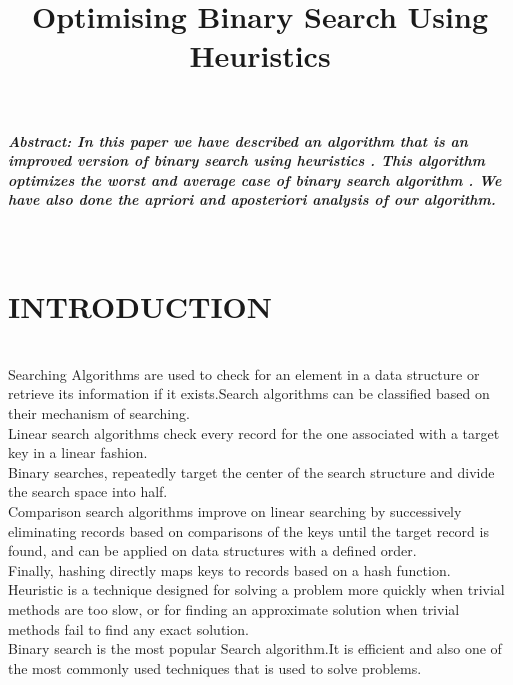 \documentclass[conference]{IEEEtran}
\begin{document}
\title{ Optimising Binary Search Using Heuristics\\
}
\author{
\and
{}
\and
{}
}

\maketitle
\paragraph{\textbf{\textit{Abstract: In this paper we have described an algorithm that is an improved version of binary search using heuristics . This   algorithm optimizes the worst and average case of binary search algorithm . We have also done the apriori and aposteriori analysis of our algorithm. }}}\\

\section{INTRODUCTION}\\
Searching Algorithms are used to check for
an element in a data structure or retrieve its information if it exists.Search algorithms can be classified based on their mechanism of searching. \\Linear search algorithms check every record for the one associated with a target key in a linear fashion. \\Binary searches, repeatedly target the center of the search structure and divide the search space into half. \\Comparison search algorithms improve on linear searching by successively eliminating records based on comparisons of the keys until the target record is found, and can be applied on data structures with a defined order. \\Finally, hashing directly maps keys to records based on a hash function. 
\\Heuristic is a technique designed for solving a
problem more quickly when trivial methods are
too slow, or for finding an approximate solution
when trivial methods fail to find any exact
solution.
\\Binary search is the most popular Search algorithm.It is efficient and also one of the most commonly used techniques that is used to solve problems.
\end{document}
